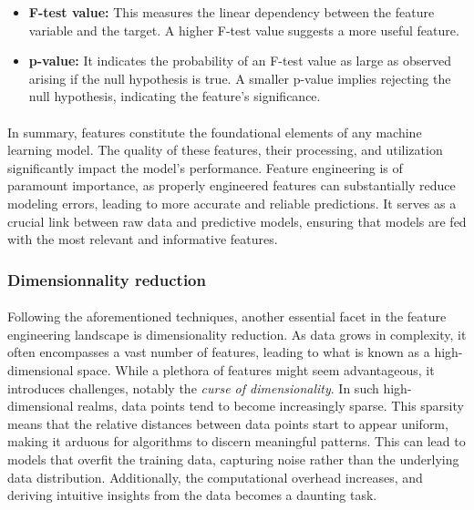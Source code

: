             \begin{itemize}
                \item \textbf{F-test value:} This measures the linear dependency between the feature variable and the target. A higher F-test value suggests a more useful feature.

                \item \textbf{p-value:} It indicates the probability of an F-test value as large as observed arising if the null hypothesis is true. A smaller p-value implies rejecting the null hypothesis, indicating the feature's significance.
            \end{itemize}
            \paragraph{}In summary, features constitute the foundational elements of any machine learning model. The quality of these features, their processing, and utilization significantly impact the model's performance. Feature engineering is of paramount importance, as properly engineered features can substantially reduce modeling errors, leading to more accurate and reliable predictions. It serves as a crucial link between raw data and predictive models, ensuring that models are fed with the most relevant and informative features.

        \subsubsection{Dimensionnality reduction}

            \paragraph{}Following the aforementioned techniques, another essential facet in the feature engineering landscape is dimensionality reduction. As data grows in complexity, it often encompasses a vast number of features, leading to what is known as a high-dimensional space. While a plethora of features might seem advantageous, it introduces challenges, notably the \textit{curse of dimensionality}\cite{hutchison_curse_2005, koppen_curse_2000}. In such high-dimensional realms, data points tend to become increasingly sparse. This sparsity means that the relative distances between data points start to appear uniform, making it arduous for algorithms to discern meaningful patterns. This can lead to models that overfit the training data, capturing noise rather than the underlying data distribution. Additionally, the computational overhead increases, and deriving intuitive insights from the data becomes a daunting task.

